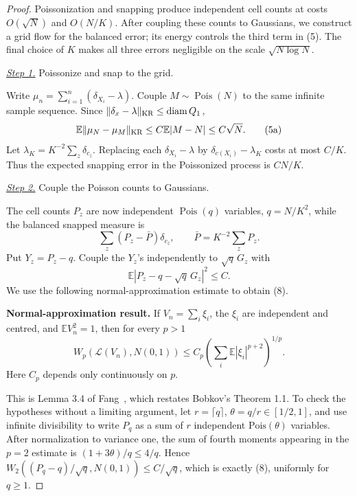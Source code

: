 \documentclass{smfart}
\theoremstyle{definition}
\newcommand{\1}{\mathbf 1}
\begin{document}
\begin{proof}
Poissonization and snapping produce independent cell counts at costs
$O(\sqrt N)$ and $O(N/K)$.  After coupling these counts to Gaussians,
we construct a grid flow for the balanced error; its energy controls the
third term in (5).  The final choice of $K$ makes all three errors
negligible on the scale $\sqrt{N\log N}$.

\smallskip\noindent
\underline{\textit{Step 1.}} Poissonize and snap to the grid.

Write $\mu_ n=\sum_ {i=1}^n(\delta_ {X_ i}-\lambda)$.  Couple
$M\sim\operatorname {Pois}(N)$ to the same infinite sample sequence.
Since $\|\delta_ x-\lambda\|_ {\rm KR}\leq\operatorname {diam}Q_ 1$,
\begin{equation}
\mathbb E\|\mu_ N-\mu_ M\|_ {\rm KR}
\leq C\mathbb E|M-N|\leq C\sqrt N.
\tag{5a}
\end{equation}
Let $\lambda_ K=K^{-2}\sum_ z\delta_ {c_ z}$.  Replacing each
$\delta_ {X_ i}-\lambda$ by
$\delta_ {c(X_ i)}-\lambda_ K$ costs at most $C/K$.  Thus the expected
snapping error in the Poissonized process is $CN/K$.

\smallskip\noindent
\underline{\textit{Step 2.}} Couple the Poisson counts to Gaussians.

The cell counts $P_ z$ are now independent
$\operatorname {Pois}(q)$ variables, $q=N/K^2$, while the balanced
snapped measure is
\begin{equation}
\sum_ z(P_ z-\bar P)\delta_ {c_ z},\qquad
\bar P=K^{-2}\sum_ zP_ z.
\tag{5b}
\end{equation}
Put $Y_ z=P_ z-q$. Couple the $Y_ z$'s independently to
$\sqrt q\,G_ z$
with
\begin{equation}
\mathbb E|P_ z-q-\sqrt q\,G_ z|^2\leq C.
\tag{8}
\end{equation}
We use the following normal-approximation estimate to obtain (8).

\textbf{Normal-approximation result.} If $V_ n=\sum_ i\xi_ i$, the $\xi_ i$
are independent and centred, and $\mathbb EV_ n^2=1$, then for every
$p>1$
\begin{equation*}
W_ p(\mathcal L(V_ n),N(0,1))
\leq C_ p\left(\sum_ i\mathbb E|\xi_ i|^{p+2}\right)^{1/p}.
\end{equation*}
Here $C_ p$ depends only continuously on $p$.

This is Lemma 3.4 of Fang~\cite{Fang2019}, which restates Bobkov's Theorem 1.1. To check the hypotheses without a limiting argument, let
$r=\lceil q\rceil$, $\theta=q/r\in[1/2,1]$, and use infinite divisibility to
write $P_ q$ as a sum of $r$ independent $\mathrm {Pois}(\theta)$
variables.  After normalization to variance one, the sum of fourth
moments appearing in the $p=2$ estimate is
$(1+3\theta)/q\leq4/q$.  Hence
$W_ 2((P_ q-q)/\sqrt q,N(0,1))\leq C/\sqrt q$, which is exactly
(8), uniformly for $q\geq1$.


\end{proof}
\end{document}

